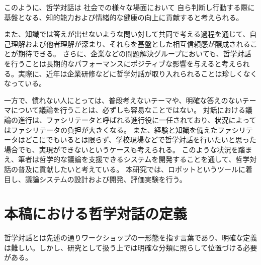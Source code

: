 \documentclass[11pt, a4paper]{jreport} %
\begin{document}




このように、哲学対話は
社会での様々な場面において
自ら判断し行動する際に基盤となる、知的能力および情緒的な健康の向上に貢献すると考えられる。


また、知識では答えが出せないような問い対して共同で考える過程を通じて、自己理解および他者理解が深まり、それらを基盤とした相互信頼感が醸成されることが期待できる。
さらに、企業などの問題解決グループにおいても、哲学対話を行うことは長期的なパフォーマンスにポジティブな影響を与えると考えられる。実際に、近年は企業研修などに哲学対話が取り入れられることは珍しくなくなっている。







一方で、慣れない人にとっては、普段考えないテーマや、明確な答えのないテーマについて議論を行うことは、必ずしも容易なことではない。
対話における議論の進行は、ファシリテータと呼ばれる進行役に一任されており、状況によってはファシリテータの負担が大きくなる。
また、経験と知識を備えたファシリテータはどこにでもいるとは限らず、学校現場などで哲学対話を行いたいと思った場合でも、実現ができないというケースも考えられる。
このような状況を踏まえ、筆者は哲学的な議論を支援できるシステムを開発することを通して、哲学対話の普及に貢献したいと考えている。
本研究では、ロボットというツールに着目し、議論システムの設計および開発、評価実験を行う。



\section{本稿における哲学対話の定義}
哲学対話とは先述の通りワークショップの一形態を指す言葉であり、明確な定義は難しい。しかし、研究として扱う上では明確な分類に照らして位置づける必要がある。
\end{document}
